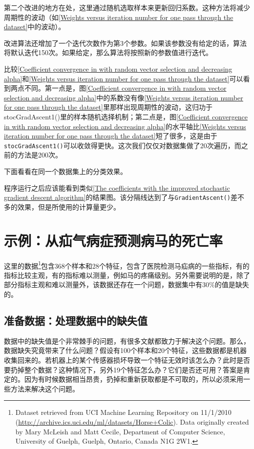 第二个改进的地方在处，这里通过随机选取样本来更新回归系数。这种方法将减少周期性的波动（如\autoref{Weights versus iteration number for one pass through the dataset}中的波动）。

改进算法还增加了一个迭代次数作为第3个参数。如果该参数没有给定的话，算法将默认迭代150次。如果给定，那么算法将按照新的参数值进行迭代。

比较\autoref{Coefficient convergence in with random vector selection and decreasing alpha}和\autoref{Weights versus iteration number for one pass through the dataset}可以看到两点不同。第一点是，图\autoref{Coefficient convergence in with random vector selection and decreasing alpha}中的系数没有像\autoref{Weights versus iteration number for one pass through the dataset}里那样出现周期性的波动，这归功于stocGradAscent1()里的样本随机选择机制；第二点是，图\autoref{Coefficient convergence in with random vector selection and decreasing alpha}的水平轴比\autoref{Weights versus iteration number for one pass through the dataset}短了很多，这是由于\verb|stocGradAscent1()|可以收敛得更快。这次我们仅仅对数据集做了20次遍历，而之前的方法是200次。

下面看看在同一个数据集上的分类效果。

程序运行之后应该能看到类似\autoref{The coefficients with the improved stochastic gradient descent algorithm}的结果图。该分隔线达到了与\verb|GradientAscent()|差不多的效果，但是所使用的计算量更少。


\section{示例：从疝气病症预测病马的死亡率}
这里的数据\footnote{Dataset retrieved from UCI Machine Learning Repository on 11/1/2010 (\url{http://archive.ics.uci.edu/ml/datasets/Horse+Colic}). Data originally created by Mary McLeish and Matt Cecile, Department of Computer Science, University of Guelph, Guelph, Ontario, Canada N1G 2W1.}包含368个样本和28个特征，包含了医院检测马疝病的一些指标，有的指标比较主观，有的指标难以测量，例如马的疼痛级别。另外需要说明的是，除了部分指标主观和难以测量外，该数据还存在一个问题，数据集中有30\%的值是缺失的。

\subsection{准备数据：处理数据中的缺失值}
数据中的缺失值是个非常棘手的问题，有很多文献都致力于解决这个问题。那么，数据缺失究竟带来了什么问题？假设有100个样本和20个特征，这些数据都是机器收集回来的。若机器上的某个传感器损坏导致一个特征无效时该怎么办？此时是否要扔掉整个数据？这种情况下，另外19个特征怎么办？它们是否还可用？答案是肯定的。因为有时候数据相当昂贵，扔掉和重新获取都是不可取的，所以必须采用一些方法来解决这个问题。

